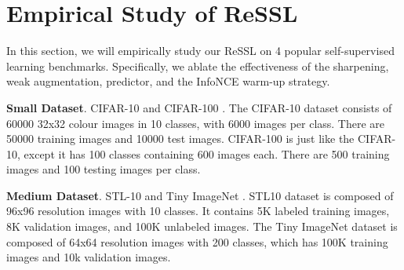 \documentclass{article}
\newcommand{\<}{\left\langle}
\renewcommand{\>}{\right\rangle}
\begin{document}
        
        
        
        
        
        
        
        
        






 \section{Empirical Study of ReSSL}
In this section, we will empirically study our ReSSL on 4 popular self-supervised learning benchmarks. Specifically, we ablate the effectiveness of the sharpening, weak augmentation, predictor, and the InfoNCE warm-up strategy.

\textbf{Small Dataset}.
CIFAR-10 and CIFAR-100 \cite{cifar}. The CIFAR-10 dataset consists of 60000 32x32 colour images in 10 classes, with 6000 images per class. There are 50000 training images and 10000 test images. CIFAR-100 is just like the CIFAR-10, except it has 100 classes containing 600 images each. There are 500 training images and 100 testing images per class.

\textbf{Medium Dataset}.
STL-10 \cite{stl10} and Tiny ImageNet \cite{tinyImagenet}. STL10 \cite{stl10} dataset is composed of 96x96 resolution images with 10 classes. It contains 5K labeled training images, 8K validation images, and 100K unlabeled images. The Tiny ImageNet dataset is composed of 64x64 resolution images with 200 classes, which has 100K training images and 10k validation images.
\end{document}
